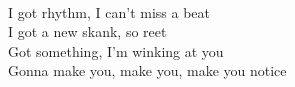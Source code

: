 \\
I got rhythm, I can't miss a beat \\
I got a new skank, so reet \\
Got something, I'm winking at you \\
Gonna make you, make you, make you notice \\
